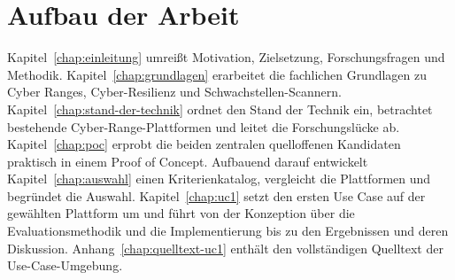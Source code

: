 \section{Aufbau der Arbeit}
\label{sec:aufbau}

Kapitel~\ref{chap:einleitung} umreißt Motivation, Zielsetzung, Forschungsfragen und Methodik.
Kapitel~\ref{chap:grundlagen} erarbeitet die fachlichen Grundlagen zu Cyber Ranges, Cyber-Resilienz
und Schwachstellen-Scannern. Kapitel~\ref{chap:stand-der-technik} ordnet den Stand der Technik ein,
betrachtet bestehende Cyber-Range-Plattformen und leitet die Forschungslücke ab.
Kapitel~\ref{chap:poc} erprobt die beiden zentralen quelloffenen Kandidaten praktisch in einem Proof
of Concept. Aufbauend darauf entwickelt Kapitel~\ref{chap:auswahl} einen Kriterienkatalog, vergleicht
die Plattformen und begründet die Auswahl. Kapitel~\ref{chap:uc1} setzt den ersten Use Case auf der
gewählten Plattform um und führt von der Konzeption über die Evaluationsmethodik und die
Implementierung bis zu den Ergebnissen und deren Diskussion. Anhang~\ref{chap:quelltext-uc1} enthält
den vollständigen Quelltext der Use-Case-Umgebung.
